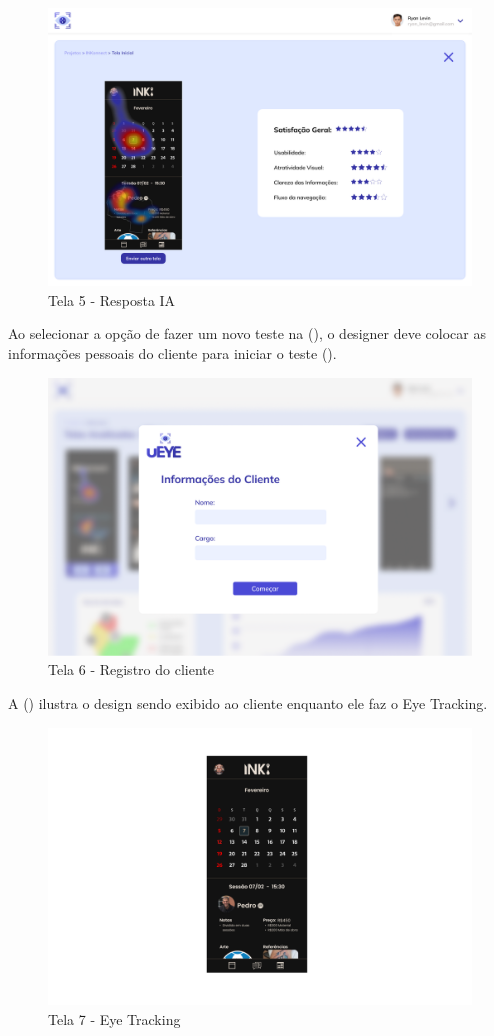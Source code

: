 \begin{figure}[H]
    \centering
    \caption{Tela 5 - Resposta IA}%
    \label{fig:pg-tela5}
    \includegraphics[width=0.72\linewidth]{Illustrations/tela5.png}
\end{figure}

Ao selecionar a opção de fazer um novo teste na (), o designer deve colocar as informações pessoais do cliente para iniciar o teste ().

\begin{figure}[H]
    \centering
    \caption{Tela 6 - Registro do cliente}%
    \label{fig:pg-tela6}
    \includegraphics[width=0.72\linewidth]{Illustrations/tela6.png}
\end{figure}

A () ilustra o design sendo exibido ao cliente enquanto ele faz o Eye Tracking.

\begin{figure}[H]
    \centering
    \caption{Tela 7 - Eye Tracking}%
    \label{fig:pg-tela7}
    \includegraphics[width=0.72\linewidth]{Illustrations/tela7.png}
\end{figure}


